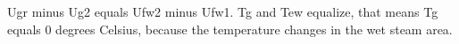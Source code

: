 Ugr minus Ug2 equals Ufw2 minus Ufw1. Tg and Tew equalize, that means Tg equals 0 degrees Celsius, because the temperature changes in the wet steam area.